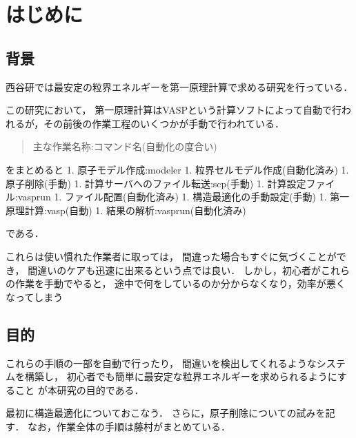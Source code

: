 \chapter{はじめに}\label{ux306fux3058ux3081ux306b}

    \section{背景}\label{ux80ccux666f}

    西谷研では最安定の粒界エネルギーを第一原理計算で求める研究を行っている．

この研究において，
第一原理計算はVASPという計算ソフトによって自動で行われるが，その前後の作業工程のいくつかが手動で行われている．

\begin{quote}
主な作業名称:コマンド名(自動化の度合い)
\end{quote}
をまとめると 1. 原子モデル作成:modeler 1. 粒界セルモデル作成(自動化済み)
1. 原子削除(手動) 1. 計算サーバへのファイル転送:scp(手動) 1.
計算設定ファイル:vasprun 1. ファイル配置(自動化済み) 1.
構造最適化の手動設定(手動) 1. 第一原理計算:vasp(自動) 1.
結果の解析:vasprun(自動化済み)

である．

これらは使い慣れた作業者に取っては，
間違った場合もすぐに気づくことができ，
間違いのケアも迅速に出来るという点では良い．
しかし，初心者がこれらの作業を手動でやると，
途中で何をしているのか分からなくなり，効率が悪くなってしまう

\section{目的}\label{ux76eeux7684}

これらの手順の一部を自動で行ったり，
間違いを検出してくれるようなシステムを構築し，
初心者でも簡単に最安定な粒界エネルギーを求められるようにすること
が本研究の目的である．

最初に構造最適化についておこなう．
さらに，原子削除についての試みを記す．
なお，作業全体の手順は藤村がまとめている．

    